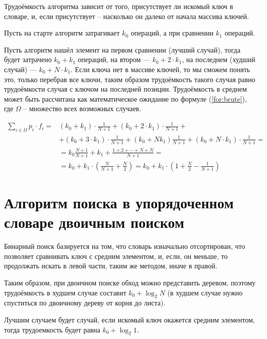 Трудоёмкость алгоритма зависит от того, присутствует ли искомый ключ в словаре, и, если присутствует -- насколько он далеко от начала массива ключей.

Пусть на старте алгоритм затрагивает $k_{0}$ операций, а при сравнении $k_{1}$ операций. 

Пусть алгоритм нашёл элемент на первом сравнении (лучший случай), тогда будет затрачено $k_0 + k_1$ операций, на втором --- $k_0 + 2 \cdot k_1$, на последнем (худший случай) --- $k_0 + N \cdot k_1$. Если ключа нет в массиве ключей, то мы сможем понять это, только перебрав все ключи, таким образом трудоёмкость такого случая равно трудоёмкости случая с ключом на последней позиции. Трудоёмкость в среднем может быть рассчитана как математическое ожидание по формуле (\ref{for:brute}), где $\Omega$ -- множество всех возможных случаев.

\begin{equation}
\label{for:brute}
\begin{aligned}
\sum\limits_{i \in \Omega} p_i \cdot f_i = & (k_0 + k_1) \cdot \frac{1}{N + 1} + (k_0 + 2 \cdot k_1) \cdot \frac{1}{N+1} +\\& + (k_0 + 3 \cdot k_1) \cdot \frac{1}{N + 1} + (k_0 + Nk_1)\frac{1}{N + 1} + (k_0 + N \cdot k_1) \cdot \frac{1}{N + 1} =\\& = k_0\frac{N+1}{N+1}+k_1+\frac{1 + 2 + \cdots + N + N}{N + 1} = \\& = k_0 + k_1 \cdot \left(\frac{N}{N + 1} + \frac{N}{2}\right) = k_0 + k_1 \cdot \left(1 + \frac{N}{2} - \frac{1}{N + 1}\right)
\end{aligned}
\end{equation}

\section{Алгоритм поиска в упорядоченном словаре двоичным поиском}
Бинарный поиск базируется на том, что словарь изначально отсортирован, что позволяет сравнивать ключ с средним элементом, и, если, он меньше, то продолжать искать в левой части, таким же методом, иначе в правой.

Таким образом, при двоичном поиске \cite{binary} обход можно представить деревом, поэтому трудоёмкость в худшем случае составит $k_{0} + \log_2 N$ (в худшем случае нужно спуститься по двоичному дереву от корня до листа).

Лучшим случаем будет случай, если искомый ключ окажется средним элементом, тогда трудоемкость будет равна $k_{0} + \log_2 1$.

